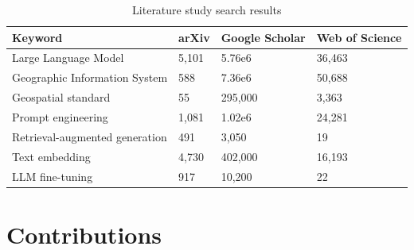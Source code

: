 \begin{table}
    \centering
    \begin{tabular}{p{5.5cm}|p{2cm}p{2cm}p{2cm}}
        \toprule
        \textbf{Keyword}               & \textbf{arXiv} & \textbf{Google Scholar} & \textbf{Web of Science} \\
        \midrule
        Large Language Model           & 5,101          & 5.76e6                  & 36,463                  \\
        Geographic Information System  & 588            & 7.36e6                  & 50,688                  \\
        Geospatial standard            & 55             & 295,000                 & 3,363                   \\
        Prompt engineering             & 1,081          & 1.02e6                  & 24,281                  \\
        Retrieval-augmented generation & 491            & 3,050                   & 19                      \\
        Text embedding                 & 4,730          & 402,000                 & 16,193                  \\
        LLM fine-tuning                & 917            & 10,200                  & 22                      \\
        \bottomrule
    \end{tabular}
    \caption{Literature study search results}
    \label{tbl:literature-search-results}
\end{table}

\section{Contributions}
\label{sec:introContributions}

